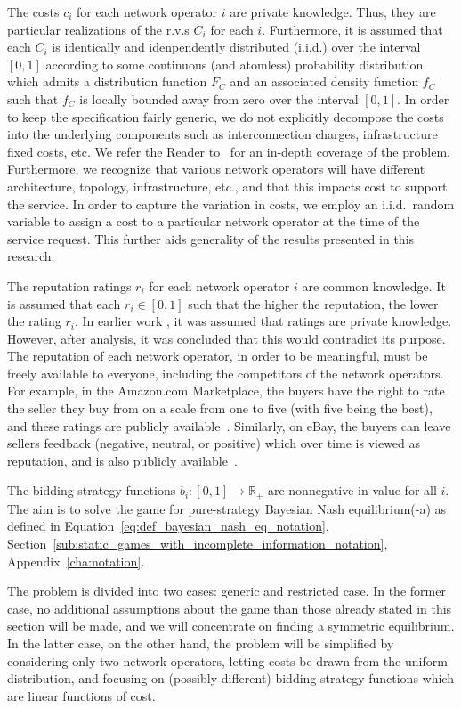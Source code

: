 The costs $c_i$ for each network operator $i$ are private knowledge. Thus, they are particular realizations of the r.v.s $C_i$ for each $i$. Furthermore, it is assumed that each $C_i$ is identically and idenpendently distributed (i.i.d.) over the interval $[0,1]$ according to some continuous (and atomless) probability distribution which admits a distribution function $F_{C}$ and an associated density function $f_{C}$ such that $f_C$ is locally bounded away from zero over the interval $[0,1]$. In order to keep the specification fairly generic, we do not explicitly decompose the costs into the underlying components such as interconnection charges, infrastructure fixed costs, etc. We refer the Reader to~\cite{Njoroge2009,LeCadre2009,HauBrenner2009} for an in-depth coverage of the problem. Furthermore, we recognize that various network operators will have different architecture, topology, infrastructure, etc., and that this impacts cost to support the service. In order to capture the variation in costs, we employ an i.i.d.~random variable to assign a cost to a particular network operator at the time of the service request. This further aids generality of the results presented in this research.

The reputation ratings $r_i$ for each network operator $i$ are common knowledge. It is assumed that each $r_i\in [0,1]$ such that the higher the reputation, the lower the rating $r_i$. In earlier work \cite{DMKonkaUbi11}, it was assumed that ratings are private knowledge. However, after analysis, it was concluded that this would contradict its purpose. The reputation of each network operator, in order to be meaningful, must be freely available to everyone, including the competitors of the network operators. For example, in the Amazon.com Marketplace, the buyers have the right to rate the seller they buy from on a scale from one to five (with five being the best), and these ratings are publicly available~\cite{AMAZON}. Similarly, on eBay, the buyers can leave sellers feedback (negative, neutral, or positive) which over time is viewed as reputation, and is also publicly available~\cite{EBAY}.
	
The bidding strategy functions $b_i: [0,1]\to\mathbb{R_+}$ are nonnegative in value for all $i$. The aim is to solve the game for pure-strategy Bayesian Nash equilibrium(-a) as defined in Equation~\eqref{eq:def_bayesian_nash_eq_notation}, Section~\ref{sub:static_games_with_incomplete_information_notation}, Appendix~\ref{cha:notation}.

The problem is divided into two cases: generic and restricted case. In the former case, no additional assumptions about the game than those already stated in this section will be made, and we will concentrate on finding a symmetric equilibrium. In the latter case, on the other hand, the problem will be simplified by considering only two network operators, letting costs be drawn from the uniform distribution, and focusing on (possibly different) bidding strategy functions which are linear functions of cost.

